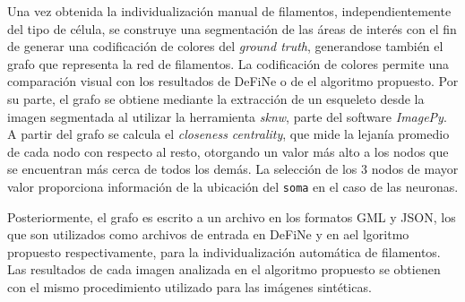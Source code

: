 Una vez obtenida la individualizaci\'on manual de filamentos, independientemente del tipo de c\'elula, se construye una segmentaci\'on de las \'areas de inter\'es con el fin de generar una codificaci\'on de colores del {\it ground truth}, generandose tambi\'en el grafo que representa la red de filamentos. La codificaci\'on de colores permite una comparaci\'on visual con los resultados de DeFiNe o de el algoritmo propuesto. Por su parte, el grafo se obtiene mediante la extracci\'on de un esqueleto desde la imagen segmentada al utilizar la herramienta {\it sknw}, parte del software {\it ImagePy}\cite{wang2018imagepy}. A partir del grafo se calcula el {\it closeness centrality}\cite{freeman1978centrality}, que mide la lejan\'ia promedio de cada nodo con respecto al resto, otorgando un valor m\'as alto a los nodos que se encuentran m\'as cerca de todos los dem\'as. La selecci\'on de los 3 nodos de mayor valor proporciona informaci\'on de la ubicaci\'on del {\tt soma} en el caso de las neuronas.


Posteriormente, el grafo es escrito a un archivo en los formatos GML y JSON, los que son utilizados como archivos de entrada en DeFiNe y en ael lgoritmo propuesto respectivamente, para la individualizaci\'on autom\'atica de filamentos.
Las resultados de cada imagen analizada en el algoritmo propuesto se obtienen con el mismo procedimiento utilizado para las im\'agenes sint\'eticas.


